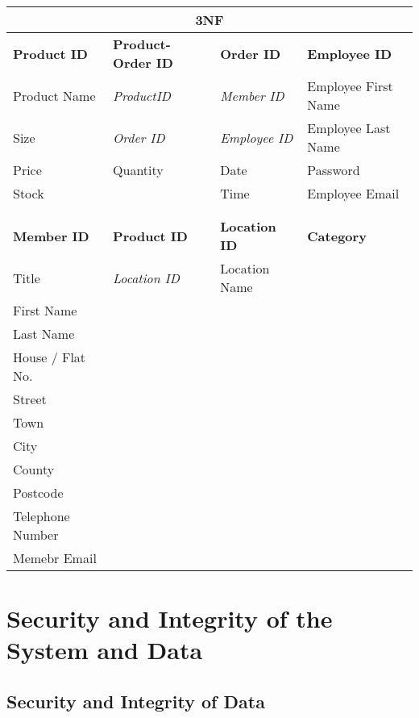 \begin{itemize}
\begin{flushleft}
\begin{center}
    \begin{tabular}{|p{3cm}|p{3cm}|p{3cm}|p{2cm}|}
        \hline
	 \multicolumn{4}{|c|}{3NF} \\ \hline
	\textbf{Product ID}  & \textbf{Product-Order ID} & \textbf{Order ID} & \textbf{Employee ID} \\ \hline
	{Product Name} & \textit{ProductID} & \textit{Member ID} & {Employee First Name} \\ \hline
	{Size} & \textit{Order ID} & \textit{Employee ID} & {Employee Last Name} \\ \hline
	{Price} & {Quantity} & {Date} & {Password} \\ \hline
	{Stock} & {} & {Time} & {Employee Email} \\ \hline
	{} & {} & {} & {}\\ \hline
	{} & {} & {} & {}\\ \hline
	\textbf{Member ID} & \textbf{Product ID} & \textbf{Location ID} & \textbf{Category}\\ \hline
	{Title} & \textit{Location ID} & {Location Name} & {}\\ \hline
	{First Name} & {} & {} & {}\\ \hline
	{Last Name} & {} & {} & {}\\ \hline
	{House / Flat No.} & {} & {} & {}\\ \hline
	{Street} & {} & {} & {}\\ \hline
	{Town} & {} & {} & {}\\ \hline
	{City} & {} & {} & {}\\ \hline
	{County} & {} & {} & {}\\ \hline
	{Postcode} & {} & {} & {}\\ \hline
	{Telephone Number} & {} & {} & {}\\ \hline
	{Memebr Email} & {} & {} & {}\\ \hline
    \end{tabular}
\end{center}
\end{flushleft}


\section{Security and Integrity of the System and Data}

\subsection{Security and Integrity of Data}


\end{itemize}
